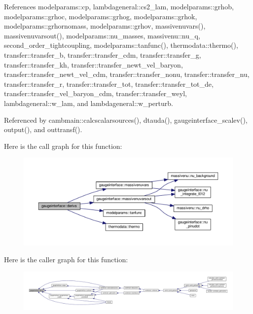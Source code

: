 References modelparams\+::cp, lambdageneral\+::cs2\+\_\+lam, modelparams\+::grhob, modelparams\+::grhoc, modelparams\+::grhog, modelparams\+::grhok, modelparams\+::grhornomass, modelparams\+::grhov, massivenuvars(), massivenuvarsout(), modelparams\+::nu\+\_\+masses, massivenu\+::nu\+\_\+q, second\+\_\+order\+\_\+tightcoupling, modelparams\+::tanfunc(), thermodata\+::thermo(), transfer\+::transfer\+\_\+b, transfer\+::transfer\+\_\+cdm, transfer\+::transfer\+\_\+g, transfer\+::transfer\+\_\+kh, transfer\+::transfer\+\_\+newt\+\_\+vel\+\_\+baryon, transfer\+::transfer\+\_\+newt\+\_\+vel\+\_\+cdm, transfer\+::transfer\+\_\+nonu, transfer\+::transfer\+\_\+nu, transfer\+::transfer\+\_\+r, transfer\+::transfer\+\_\+tot, transfer\+::transfer\+\_\+tot\+\_\+de, transfer\+::transfer\+\_\+vel\+\_\+baryon\+\_\+cdm, transfer\+::transfer\+\_\+weyl, lambdageneral\+::w\+\_\+lam, and lambdageneral\+::w\+\_\+perturb.



Referenced by cambmain\+::calcscalarsources(), dtauda(), gaugeinterface\+\_\+scalev(), output(), and outtransf().

Here is the call graph for this function\+:
\nopagebreak
\begin{figure}[H]
\begin{center}
\leavevmode
\includegraphics[width=350pt]{namespacegaugeinterface_a1d317261c83f3b5e84fe401ac2436d44_cgraph}
\end{center}
\end{figure}
Here is the caller graph for this function\+:
\nopagebreak
\begin{figure}[H]
\begin{center}
\leavevmode
\includegraphics[width=350pt]{namespacegaugeinterface_a1d317261c83f3b5e84fe401ac2436d44_icgraph}
\end{center}
\end{figure}
\mbox{\label{namespacegaugeinterface_ab2ff4cd74364457862a7ff44fb2ca978}} 
